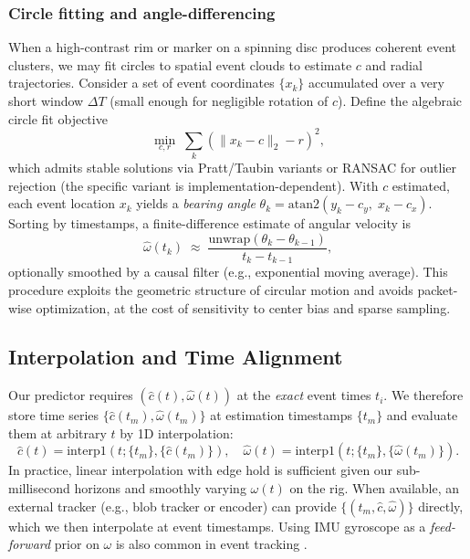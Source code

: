 \subsubsection{Circle fitting and angle-differencing}
When a high-contrast rim or marker on a spinning disc produces coherent event clusters, we may fit circles to spatial event clouds to estimate $c$ and radial trajectories. Consider a set of event coordinates $\{x_k\}$ accumulated over a very short window $\Delta T$ (small enough for negligible rotation of $c$). Define the algebraic circle fit objective
\begin{equation}
\min_{c,r}\;\sum_{k}\left(\|x_k - c\|_2 - r\right)^2,
\label{eq:circlefit}
\end{equation}
which admits stable solutions via Pratt/Taubin variants or RANSAC for outlier rejection (the specific variant is implementation-dependent). With $c$ estimated, each event location $x_k$ yields a \emph{bearing angle} $\theta_k = \mathrm{atan2}(y_k-c_y,\;x_k-c_x)$. Sorting by timestamps, a finite-difference estimate of angular velocity is
\begin{equation}
\hat\omega(t_k) \;\approx\; \frac{\mathrm{unwrap}\!\left(\theta_k-\theta_{k-1}\right)}{t_k - t_{k-1}},
\label{eq:angvel-diff}
\end{equation}
optionally smoothed by a causal filter (e.g., exponential moving average). This procedure exploits the geometric structure of circular motion and avoids packet-wise optimization, at the cost of sensitivity to center bias and sparse sampling.

\subsection{Interpolation and Time Alignment}
Our predictor requires $(\hat c(t),\hat\omega(t))$ at the \emph{exact} event times $t_i$. We therefore store time series $\{\hat c(t_m),\hat\omega(t_m)\}$ at estimation timestamps $\{t_m\}$ and evaluate them at arbitrary $t$ by 1D interpolation:
\begin{equation}
\hat c(t) \!=\! \mathrm{interp1}\!\left(t;\{t_m\},\{\hat c(t_m)\}\right),\quad
\hat\omega(t) \!=\! \mathrm{interp1}\!\left(t;\{t_m\},\{\hat\omega(t_m)\}\right).
\label{eq:interp}
\end{equation}
In practice, linear interpolation with edge hold is sufficient given our sub-millisecond horizons and smoothly varying $\omega(t)$ on the rig. When available, an external tracker (e.g., blob tracker or encoder) can provide $\{(t_m,\hat c,\hat\omega)\}$ directly, which we then interpolate at event timestamps. Using IMU gyroscope as a \emph{feed-forward} prior on $\omega$ is also common in event tracking \cite{Rebecq2017EVO,Wang2025Thesis}.

